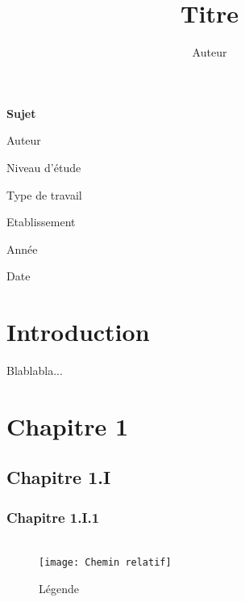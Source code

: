 \documentclass[a4paper,12pt]{report}
\title{Titre}
\author{Auteur}
\begin{document}
\begin{titlepage}
\begin{center}
\vspace*{6cm}
{\bf \Large Sujet}
\vspace{0.3cm}


\vspace{1.5cm}
Auteur

\vspace{0.3cm}
Niveau d'étude

\vspace{1.5cm}
Type de travail

\vspace{1.5cm}
Etablissement

\vspace{0.3cm}
Année

\vspace{1.5cm}
Date
\end{center}
\end{titlepage}


\tableofcontents

\newpage

\pagestyle{myfancystyle}






\setcounter{page}{1}
\chapter*{Introduction}\label{introduction}

Blablabla...

\newpage






\chapter{Chapitre 1}
\section{Chapitre 1.I}
\subsection{Chapitre 1.I.1}

\begin{eqnarray}
\end{eqnarray}

\begin{figure}
    \centering
    \texttt{[image: Chemin relatif]}
    \label{Label}
    \caption{Légende}
\end{figure}




\end{document}
